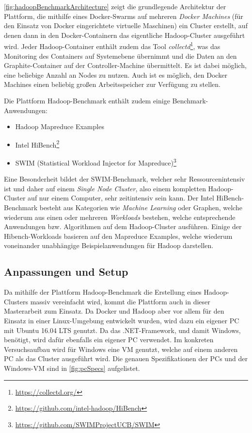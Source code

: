 \autoref{fig:hadoopBenchmarkArchitecture} zeigt die grundlegende Architektur der Plattform, die mithilfe eines Docker-Swarms auf mehreren \emph{Docker Machines} (für den Einsatz von Docker eingerichtete virtuelle Maschinen) ein Cluster erstellt, auf denen dann in den Docker-Containern das eigentliche Hadoop-Cluster ausgeführt wird. Jeder Hadoop-Container enthält zudem das Tool \emph{collectd}\footnote{\url{https://collectd.org/}}, was das Monitoring des Containers auf Systemebene übernimmt und die Daten an den Graphite-Container auf der Controller-Machine übermittelt. Es ist dabei möglich, eine beliebige Anzahl an Nodes zu nutzen. Auch ist es möglich, den Docker Machines einen beliebig großen Arbeitsspeicher zur Verfügung zu stellen.

Die Plattform Hadoop-Benchmark enthält zudem einige Benchmark-Anwendungen:

\begin{itemize}[noitemsep]
    \item Hadoop Mapreduce Examples
    \item Intel HiBench\footnote{\url{https://github.com/intel-hadoop/HiBench}}
    \item SWIM (Statistical Workload Injector for Mapreduce)\footnote{\url{https://github.com/SWIMProjectUCB/SWIM}}
\end{itemize}

Eine Besonderheit bildet der SWIM-Benchmark, welcher sehr Ressourcenintensiv ist und daher auf einem \emph{Single Node Cluster}, also einem kompletten Hadoop-Cluster auf nur einem Computer, sehr zeitintensiv sein kann. Der Intel HiBench-Benchmark besteht aus Kategorien wie \emph{Machine Learning} oder Graphen, welche wiederum aus einen oder mehreren \emph{Workloads} bestehen, welche entsprechende Anwendungen bzw. Algorithmen auf dem Hadoop-Cluster ausführen. Einige der Hibench-Workloads basieren auf den Mapreduce Examples, welche wiederum voneinander unabhängige Beispielanwendungen für Hadoop darstellen.

\subsection{Anpassungen und Setup}\label{sec:clusterFallstudie}

Da mithilfe der Plattform Hadoop-Benchmark die Erstellung eines Hadoop-Clusters massiv vereinfacht wird, kommt die Plattform auch in dieser Masterarbeit zum Einsatz. Da Docker und Hadoop aber vor allem für den Einsatz in einer Linux-Umgebung entwickelt wurden, wird dazu ein eigener PC mit Ubuntu 16.04 LTS genutzt. Da \sS das .NET-Framework, und damit Windows, benötigt, wird dafür ebenfalls ein eigener PC verwendet. Im konkreten Versuchsaufbau wird für Windows eine VM genutzt, welche auf einem anderen PC als das Cluster ausgeführt wird. Die genauen Spezifikationen der PCs und der Windows-VM sind in \autoref{fig:pcSpecs} aufgelistet.

